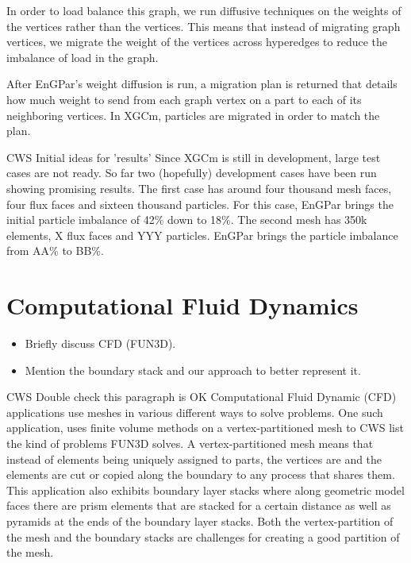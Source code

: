 \documentclass[conference]{IEEEtran}
\begin{document}
In order to load balance this graph, we run diffusive techniques on the weights of the vertices
rather than the vertices. This means that instead of migrating graph vertices, we migrate the
weight of the vertices across hyperedges to reduce the imbalance of load in the graph.

After EnGPar's weight diffusion is run, a migration plan is returned that details how
much weight to send from each graph vertex on a part to each of its neighboring vertices.
In XGCm, particles are migrated in order to match the plan.

{\color{red} CWS Initial ideas for 'results'}
Since XGCm is still in development, large test cases are not ready. So far two (hopefully)
development
cases have been run showing promising results. The first case has around four thousand
mesh faces, four flux faces and sixteen thousand particles. For this case, EnGPar brings the
initial particle imbalance of 42\% down to 18\%.
The second mesh has 350k elements, X flux faces and YYY particles. EnGPar brings the
particle imbalance from AA\% to BB\%.

\section{Computational Fluid Dynamics}

\begin{itemize}
\item Briefly discuss CFD (FUN3D).
\item Mention the boundary stack and our approach to better represent it.
\end{itemize}

{\color{red} CWS Double check this paragraph is OK}
Computational Fluid Dynamic (CFD) applications use meshes in various different ways to solve
problems. One such application, uses finite volume methods on a vertex-partitioned mesh to
{\color{red} CWS list the kind of problems FUN3D solves}. A vertex-partitioned mesh means that
instead of elements being uniquely assigned to parts, the vertices are and the elements are
cut or copied along the boundary to any process that shares them. This application also exhibits
boundary layer stacks where along geometric model faces there are prism elements that are stacked
for a certain distance as well as pyramids at the ends of the boundary layer stacks. Both the
vertex-partition of the mesh and the boundary stacks are challenges for creating a good partition
of the mesh.
\end{document}
